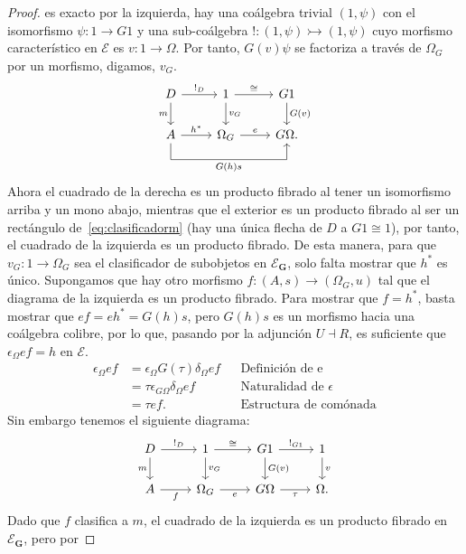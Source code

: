 \begin{proof}
  es exacto por la izquierda, hay una coálgebra trivial $(1,\psi)$ con el isomorfismo $\psi\colon 1\to G1$ y
  una sub-coálgebra $!\colon (1,\psi)\rightarrowtail (1,\psi)$ cuyo morfismo característico en $\mathcal{E}$ es $v\colon 1\to \Omega$.
  Por tanto, $G(v)\psi$ se factoriza a través de $\Omega_G$ por un morfismo, digamos, $v_G$.
  \begin{equation*}
    \begin{tikzcd}
      D\ar{r}{!_D}\ar[swap]{d}{m} & 1\ar{r}{\cong}\ar{d}{v_G} & G1\ar{d}{G(v)} \\
      A\ar{r}{h^*}\ar[to path = { -- ([yshift=-3ex]\tikztostart.south) -| (\tikztotarget.south)\tikztonodes}]{rr}[swap,pos=0.25]{G(h)s}
      & \Omega_G\ar{r}{e} & G\Omega.
    \end{tikzcd}
  \end{equation*}
Ahora el cuadrado de la derecha es un producto fibrado al tener un isomorfismo arriba y un mono abajo,
mientras que el exterior es un producto fibrado al ser un rectángulo de~\eqref{eq:clasificadorm} (hay una única
flecha de $D$ a $G1\cong 1$), por tanto, el cuadrado de la izquierda es un producto fibrado. De esta manera,
para que $v_G\colon 1\to \Omega_G$ sea el clasificador de subobjetos en $\mathcal{E}_\textbf{G}$, solo falta mostrar que
$h^*$ es único. Supongamos que hay otro morfismo $f\colon (A,s)\to (\Omega_G,u)$ tal que el diagrama de la izquierda
es un producto fibrado. Para mostrar que $f=h^*$, basta mostrar que $ef=eh^*=G(h)s$, pero $G(h)s$ es un morfismo
hacia una coálgebra colibre, por lo que, pasando por la adjunción $U\dashv R$, es suficiente que
$\epsilon_{\Omega}ef=h$ en $\mathcal{E}$.
\begin{align*}
  \epsilon_{\Omega}ef &= \epsilon_{\Omega}G(\tau)\delta_{\Omega}ef && \text{Definición de e} \\
  &= \tau\epsilon_{G\Omega}\delta_{\Omega}ef && \text{Naturalidad de $\epsilon$} \\
  &= \tau ef. && \text{Estructura de comónada}
\end{align*}
Sin embargo tenemos el siguiente diagrama:
\begin{equation*}
  \begin{tikzcd}
    D\ar{r}{!_D}\ar[swap]{d}{m} & 1\ar{r}{\cong}\ar{d}{v_G} & G1\ar{r}{!_{G1}}\ar{d}{G(v)} & 1\ar{d}{v} \\
    A\ar[swap]{r}{f} & \Omega_G\ar[swap]{r}{e} & G\Omega\ar[swap]{r}{\tau} & \Omega.
  \end{tikzcd}
\end{equation*}
Dado que $f$ clasifica a $m$, el cuadrado de la izquierda es un producto fibrado en $\mathcal{E}_\textbf{G}$, pero por

\end{proof}
